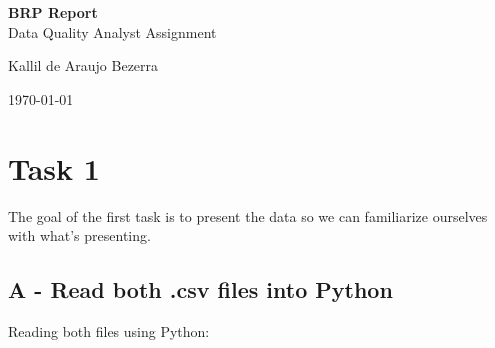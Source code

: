 \documentclass[a4paper, 12pt]{article}
\begin{document}

\begin{titlepage}
	\begin{center}
	

		\textbf{\Large{BRP Report}}\\
		\large{Data Quality Analyst Assignment}\\ 
		\vspace{15pt}
        \vspace{95pt}
		\vspace{3,5cm}
	\end{center}
	
	\begin{flushleft}
		\begin{tabbing}
			Kallil de Araujo Bezerra \\
	\end{tabbing}
 \end{flushleft}
	\vspace{1cm}
	
	\begin{center}
		\vspace{\fill}
			\today
	\end{center}
\end{titlepage}


\newpage
\tableofcontents
\thispagestyle{empty}

\newpage
{}
\section{Task 1}

The goal of the first task is to present the data so we can familiarize ourselves with what's presenting.

\subsection{A - Read both .csv files into Python}
Reading both files using Python:
\end{document}
